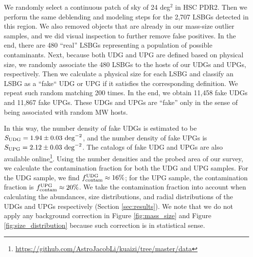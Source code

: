 \documentclass[twocolumn,astrosymb,twocolappendix]{aastex631}
\begin{document}
\begin{CJK*}{UTF8}{gbsn}
We randomly select a continuous patch of sky of 24 deg$^{2}$ in HSC PDR2. Then we perform the same deblending and modeling steps for the 2,707 LSBGs detected in this region. We also removed objects that are already in our mass-size outlier samples, and we did visual inspection to further remove false positives. In the end, there are 480 ``real'' LSBGs representing a population of possible contaminants. Next, because both UDG and UPG are defined based on physical size, we randomly associate the 480 LSBGs to the hosts of our UDGs and UPGs, respectively. Then we calculate a physical size for each LSBG and classify an LSBG as a ``fake`` UDG or UPG if it satisfies the corresponding definition. We repeat such random matching 200 times. In the end, we obtain 11,458 fake UDGs and 11,867 fake UPGs. These UDGs and UPGs are ``fake'' only in the sense of being associated with random MW hosts. 

In this way, the number density of fake UDGs is estimated to be $S_{\rm UDG} = 1.94\pm0.03\ \mathrm{deg}^{-2}$, and the number density of fake UPGs is $S_{\rm UPG} = 2.12\pm0.03\ \mathrm{deg}^{-2}$. The catalogs of fake UDG and UPGs are also available online\footnote{\url{https://github.com/AstroJacobLi/kuaizi/tree/master/data}}. Using the number densities and the probed area of our survey, we calculate the contamination fraction for both the UDG and UPG samples. For the UDG sample, we find $f_{\rm contam}^{\rm UDG} \approx 16\%$; for the UPG sample, the contamination fraction is $f_{\rm contam}^{\rm UPG} \approx 20\%$. We take the contamination fraction into account when calculating the abundances, size distributions, and radial distributions of the UDGs and UPGs respectively (Section \ref{sec:results}). We note that we do not apply any background correction in Figure \ref{fig:mass_size} and Figure \ref{fig:size_distribution} because such correction is in statistical sense.


\end{CJK*}
\end{document}
